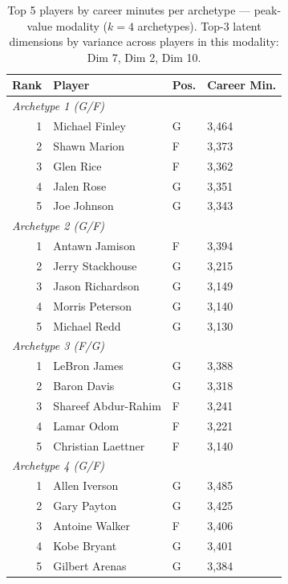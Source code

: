 \begin{table}[htbp]
  \centering\small
  \begin{tabular}{rlll}
    \toprule
    Rank & Player & Pos. & Career Min. \\
    \midrule
    \multicolumn{4}{l}{\textit{Archetype 1 (G/F)}} \\
    \midrule
    1 & Michael Finley & G & 3,464 \\
    2 & Shawn Marion & F & 3,373 \\
    3 & Glen Rice & F & 3,362 \\
    4 & Jalen Rose & G & 3,351 \\
    5 & Joe Johnson & G & 3,343 \\
    \midrule[0.4pt]
    \multicolumn{4}{l}{\textit{Archetype 2 (G/F)}} \\
    \midrule
    1 & Antawn Jamison & F & 3,394 \\
    2 & Jerry Stackhouse & G & 3,215 \\
    3 & Jason Richardson & G & 3,149 \\
    4 & Morris Peterson & G & 3,140 \\
    5 & Michael Redd & G & 3,130 \\
    \midrule[0.4pt]
    \multicolumn{4}{l}{\textit{Archetype 3 (F/G)}} \\
    \midrule
    1 & LeBron James & G & 3,388 \\
    2 & Baron Davis & G & 3,318 \\
    3 & Shareef Abdur-Rahim & F & 3,241 \\
    4 & Lamar Odom & F & 3,221 \\
    5 & Christian Laettner & F & 3,140 \\
    \midrule[0.4pt]
    \multicolumn{4}{l}{\textit{Archetype 4 (G/F)}} \\
    \midrule
    1 & Allen Iverson & G & 3,485 \\
    2 & Gary Payton & G & 3,425 \\
    3 & Antoine Walker & F & 3,406 \\
    4 & Kobe Bryant & G & 3,401 \\
    5 & Gilbert Arenas & G & 3,384 \\
    \bottomrule
  \end{tabular}
  \caption{Top 5 players by career minutes per archetype --- peak-value modality ($k=4$ archetypes). Top-3 latent dimensions by variance across players in this modality: Dim 7, Dim 2, Dim 10.}
  \label{tab:arch_reps_peak_value}
\end{table}

